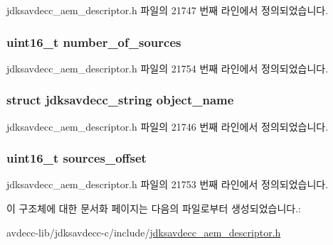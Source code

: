 jdksavdecc\+\_\+aem\+\_\+descriptor.\+h 파일의 21747 번째 라인에서 정의되었습니다.

\subsubsection[{\texorpdfstring{number\+\_\+of\+\_\+sources}{number_of_sources}}]{\setlength{\rightskip}{0pt plus 5cm}uint16\+\_\+t number\+\_\+of\+\_\+sources}\hypertarget{structjdksavdecc__descriptor__signal__combiner_a1af3a7f3729937d5da218737ba5b2483}{}\label{structjdksavdecc__descriptor__signal__combiner_a1af3a7f3729937d5da218737ba5b2483}


jdksavdecc\+\_\+aem\+\_\+descriptor.\+h 파일의 21754 번째 라인에서 정의되었습니다.

\subsubsection[{\texorpdfstring{object\+\_\+name}{object_name}}]{\setlength{\rightskip}{0pt plus 5cm}struct {\bf jdksavdecc\+\_\+string} object\+\_\+name}\hypertarget{structjdksavdecc__descriptor__signal__combiner_a7d1f5945a13863b1762fc6db74fa8f80}{}\label{structjdksavdecc__descriptor__signal__combiner_a7d1f5945a13863b1762fc6db74fa8f80}


jdksavdecc\+\_\+aem\+\_\+descriptor.\+h 파일의 21746 번째 라인에서 정의되었습니다.

\subsubsection[{\texorpdfstring{sources\+\_\+offset}{sources_offset}}]{\setlength{\rightskip}{0pt plus 5cm}uint16\+\_\+t sources\+\_\+offset}\hypertarget{structjdksavdecc__descriptor__signal__combiner_ac9ce4e1b642e6654d49504898dbe738d}{}\label{structjdksavdecc__descriptor__signal__combiner_ac9ce4e1b642e6654d49504898dbe738d}


jdksavdecc\+\_\+aem\+\_\+descriptor.\+h 파일의 21753 번째 라인에서 정의되었습니다.



이 구조체에 대한 문서화 페이지는 다음의 파일로부터 생성되었습니다.\+:\begin{DoxyCompactItemize}
\item 
avdecc-\/lib/jdksavdecc-\/c/include/\hyperlink{jdksavdecc__aem__descriptor_8h}{jdksavdecc\+\_\+aem\+\_\+descriptor.\+h}\end{DoxyCompactItemize}
